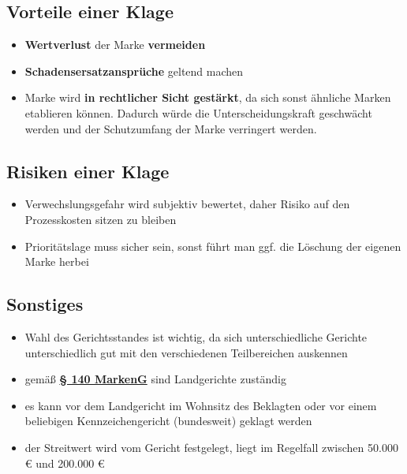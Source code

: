 \documentclass[12pt,A4]{extarticle}
\newcommand{\markenG}[2][]{\textbf{\textcolor{markenGesetzLink}{\href{https://www.gesetze-im-internet.de/markeng/__#2.html}{§ #2 \ifthenelse{\equal{#1}{}}{}{#1 }MarkenG}}}}
\begin{document}
\subsection{Vorteile einer Klage}
\begin{itemize}
  \item{\textbf{Wertverlust} der Marke \textbf{vermeiden}}
  \item{\textbf{Schadensersatzansprüche} geltend machen}
  \item{Marke wird \textbf{in rechtlicher Sicht gestärkt}, da sich sonst ähnliche Marken etablieren können. Dadurch würde die Unterscheidungskraft geschwächt werden und der Schutzumfang der Marke verringert werden.}
\end{itemize}

\subsection{Risiken einer Klage}
\begin{itemize}
  \item{Verwechslungsgefahr wird subjektiv bewertet, daher Risiko auf den Prozesskosten sitzen zu bleiben}
  \item{Prioritätslage muss sicher sein, sonst führt man ggf. die Löschung der eigenen Marke herbei}
\end{itemize}

\subsection{Sonstiges}
\begin{itemize}
  \item{Wahl des Gerichtsstandes ist wichtig, da sich unterschiedliche Gerichte unterschiedlich gut mit den verschiedenen Teilbereichen auskennen}
  \item{gemäß \markenG{140} sind Landgerichte zuständig}
  \item{es kann vor dem Landgericht im Wohnsitz des Beklagten oder vor einem beliebigen Kennzeichengericht (bundesweit) geklagt werden}
  \item{der Streitwert wird vom Gericht festgelegt, liegt im Regelfall zwischen 50.000 € und 200.000 €}
\end{itemize}
\end{document}
